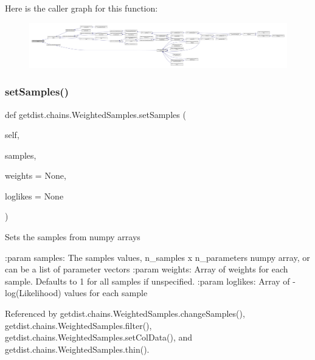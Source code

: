 Here is the caller graph for this function\+:
\nopagebreak
\begin{figure}[H]
\begin{center}
\leavevmode
\includegraphics[width=350pt]{classgetdist_1_1chains_1_1WeightedSamples_a977e6b59952fb92233a9e2d330c984ad_icgraph}
\end{center}
\end{figure}
\mbox{\label{classgetdist_1_1chains_1_1WeightedSamples_a94b1bddfee0767cad6fdca9c12a045d9}} 
\subsubsection{\texorpdfstring{set\+Samples()}{setSamples()}}
{\footnotesize\ttfamily def getdist.\+chains.\+Weighted\+Samples.\+set\+Samples (\begin{DoxyParamCaption}\item[{}]{self,  }\item[{}]{samples,  }\item[{}]{weights = {\ttfamily None},  }\item[{}]{loglikes = {\ttfamily None} }\end{DoxyParamCaption})}

\begin{DoxyVerb}Sets the samples from numpy arrays

:param samples: The samples values, n_samples x n_parameters numpy array, or can be a list of parameter vectors
:param weights: Array of weights for each sample. Defaults to 1 for all samples if unspecified.
:param loglikes: Array of -log(Likelihood) values for each sample
\end{DoxyVerb}
 

Referenced by getdist.\+chains.\+Weighted\+Samples.\+change\+Samples(), getdist.\+chains.\+Weighted\+Samples.\+filter(), getdist.\+chains.\+Weighted\+Samples.\+set\+Col\+Data(), and getdist.\+chains.\+Weighted\+Samples.\+thin().

